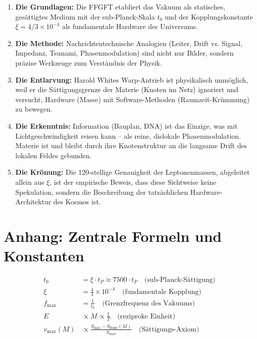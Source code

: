 \documentclass[12pt,a4paper]{article}
\begin{document}
	\begin{enumerate}
		\item \textbf{Die Grundlagen:} Die FFGFT etabliert das Vakuum als statisches, gesättigtes Medium mit der sub-Planck-Skala $t_0$ und der Kopplungskonstante $\xi = 4/3 \times 10^{-4}$ als fundamentale Hardware des Universums.
		
		\item \textbf{Die Methode:} Nachrichtentechnische Analogien (Leiter, Drift vs. Signal, Impedanz, Tsunami, Phasenmodulation) sind nicht nur Bilder, sondern präzise Werkzeuge zum Verständnis der Physik.
		
		\item \textbf{Die Entlarvung:} Harold Whites Warp-Antrieb ist physikalisch unmöglich, weil er die Sättigungsgrenze der Materie (Knoten im Netz) ignoriert und versucht, Hardware (Masse) mit Software-Methoden (Raumzeit-Krümmung) zu bewegen.
		
		\item \textbf{Die Erkenntnis:} Information (Bauplan, DNA) ist das Einzige, was mit Lichtgeschwindigkeit reisen kann – als reine, dislokale Phasenmodulation. Materie ist und bleibt durch ihre Knotenstruktur an die langsame Drift des lokalen Feldes gebunden.
		
		\item \textbf{Die Krönung:} Die 120-stellige Genauigkeit der Leptonenmassen, abgeleitet allein aus $\xi$, ist der empirische Beweis, dass diese Sichtweise keine Spekulation, sondern die Beschreibung der tatsächlichen Hardware-Architektur des Kosmos ist.
	\end{enumerate}
	
	\appendix
	\section{Anhang: Zentrale Formeln und Konstanten}
	
	\begin{align}
		t_0 &= \xi \cdot t_P \approx 7500 \cdot t_P \quad \text{(sub-Planck-Sättigung)} \\
		\xi &= \frac{4}{3} \times 10^{-4} \quad \text{(fundamentale Kopplung)} \\
		f_{\text{max}} &= \frac{1}{t_0} \quad \text{(Grenzfrequenz des Vakuums)} \\
		E &\propto M \propto \frac{1}{T} \quad \text{(reziproke Einheit)} \\
		v_{\text{max}}(M) &\propto \frac{S_{\text{max}} - S_{\text{Ruhe}}(M)}{S_{\text{max}}} \quad \text{(Sättigungs-Axiom)}
	\end{align}
	
\end{document}

